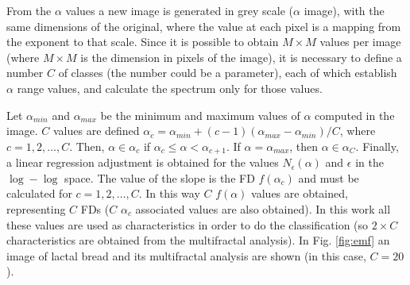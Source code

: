 \documentclass[oneside,a4paper,english,links]{amca}
\begin{document}
From the $\alpha$ values a new image is generated in grey scale ($\alpha$ image), with the same dimensions of the original, where the value at each pixel is a mapping from the exponent to that scale. Since it is possible to obtain $M\times M$ values per image (where $M\times M$ is the dimension in pixels of the image), it is necessary to define a number $C$ of classes (the number could be a parameter), each of which establish $\alpha$ range values, and calculate the spectrum only for those values.

Let $\alpha_{min}$ and  $\alpha_{max}$ be the minimum and maximum values of $\alpha$ computed in the image. $C$ values are defined $\alpha_{c} = \alpha_{min} + (c-1)(\alpha_{max}-\alpha_{min})/C$, where $c = 1,2,\dots,C$. Then, $\alpha \in \alpha_{c}$ if $\alpha_{c} \leq \alpha < \alpha_{c+1}$. If $\alpha = \alpha_{max}$, then $\alpha \in \alpha_{C}$. Finally, a linear regression adjustment is obtained for the values $N_{\epsilon}(\alpha)$ and $\epsilon$ in the $\log-\log$ space. The value of the slope is the FD $f(\alpha_{c})$ and must be calculated for $c = 1,2,\dots,C$. In this way $C$ $f(\alpha)$ values are obtained, representing $C$ FDs ($C$ $\alpha_{c}$ associated values are also obtained). In this work all these values are used as characteristics in order to do the classification (so $2\times C$ characteristics are obtained from the multifractal analysis). In Fig. \ref{fig:emf} an image of lactal bread and its multifractal analysis are shown (in this case, $C = 20$).
\end{document}
